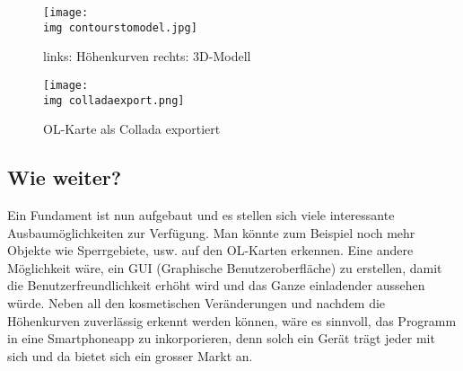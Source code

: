\begin{figure}[hbt]
	\centering
	\texttt{[image: \\img contourstomodel.jpg]}
	\caption{links: Höhenkurven rechts: 3D-Modell}
	\label{fig:courvecompare}
\end{figure}

\begin{figure}[hbt]
	\centering
	\texttt{[image: \\img colladaexport.png]}
	\caption{OL-Karte als Collada exportiert}
	\label{fig:colladaexample}
\end{figure}

\subsection{Wie weiter?}

Ein Fundament ist nun aufgebaut und es stellen sich viele interessante Ausbaumöglichkeiten zur Verfügung. Man könnte zum Beispiel noch mehr Objekte wie Sperrgebiete, usw. auf den OL-Karten erkennen. Eine andere Möglichkeit wäre, ein GUI (Graphische Benutzeroberfläche) zu erstellen, damit die Benutzerfreundlichkeit erhöht wird und das Ganze einladender aussehen würde. Neben all den kosmetischen Veränderungen und nachdem die Höhenkurven zuverlässig erkennt werden können, wäre es sinnvoll, das Programm in eine Smartphoneapp zu inkorporieren, denn solch ein Gerät trägt jeder mit sich und da bietet sich ein grosser Markt an.
